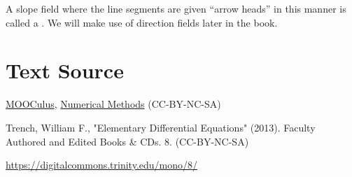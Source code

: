 \documentclass{ximera}
\begin{document}
A slope field where the line segments are given ``arrow heads'' in this manner is called a .  We will make use of direction fields later in the book. 
 
 
 
\section*{Text Source}
 
\href{https://github.com/mooculus/calculus}{MOOCulus}, \href{https://github.com/mooculus/calculus/blob/6255bcdf3fae1b17972a7ae4883841bf25464c61/numericalMethods/digInSlopeFieldsAndEulersMethod.tex#L22}{Numerical Methods} (CC-BY-NC-SA)
 
 
Trench, William F., "Elementary Differential Equations" (2013). Faculty Authored and Edited Books \& CDs. 8. (CC-BY-NC-SA)
 
\href{https://digitalcommons.trinity.edu/mono/8/}{https://digitalcommons.trinity.edu/mono/8/}
 
 
\end{document}

